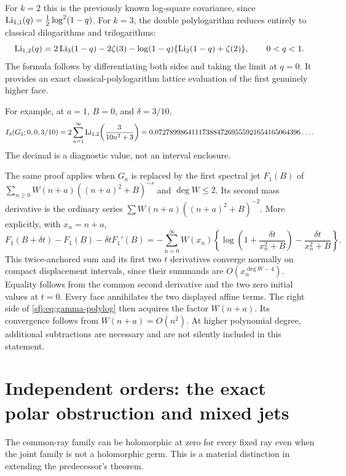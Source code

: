 For $k=2$ this is the previously known log-square covariance,
since $\operatorname{Li}_{1,1}(q)=\frac12\log^2(1-q)$.  For $k=3$, the double
polylogarithm reduces entirely to classical dilogarithms and
trilogarithms:
\begin{equation}\label{sfj:eq:Li12-classical}
 \operatorname{Li}_{1,2}(q)=2\operatorname{Li}_3(1-q)-2\zeta(3)
            -\log(1-q)\{\operatorname{Li}_2(1-q)+\zeta(2)\},\qquad 0<q<1.
\end{equation}
The formula follows by differentiating both sides and taking the
limit at $q=0$.  It provides an exact classical-polylogarithm lattice
evaluation of the first genuinely higher face.

For example, at $a=1$, $B=0$, and $\delta=3/10$,
\begin{equation}\label{sfj:eq:numeric-example}
 I_3(G_1;0,0,3/10)
   =2\sum_{n=1}^\infty\operatorname{Li}_{1,2}\!\left(\frac{3}{10n^2+3}\right)
   =0.0727899864111738847269555921654165064396\ldots.
\end{equation}
The decimal is a diagnostic value, not an interval enclosure.

\begin{remark}
The same proof applies when $G_a$ is replaced by the first spectral
jet $F_1(B)$ of $\sum_{n\ge0}W(n+a)((n+a)^2+B)^{-s}$ and
$\deg W\le2$.  Its second mass derivative is the ordinary series
$\sum W(n+a)((n+a)^2+B)^{-2}$.  More explicitly, with $x_n=n+a$,
\[
 F_1(B+\delta t)-F_1(B)-\delta tF_1'(B)
 =-\sum_{n=0}^{\infty}W(x_n)
   \left\{\log\left(1+\frac{\delta t}{x_n^2+B}\right)
                       -\frac{\delta t}{x_n^2+B}\right\}.
\]
This twice-anchored sum and its first two $t$ derivatives converge
normally on compact displacement intervals, since their summands are
$O(x_n^{\deg W-4})$.  Equality follows from the common second
derivative and the two zero initial values at $t=0$.  Every face
annihilates the two displayed affine terms.  The right side of
\eqref{sfj:eq:gamma-polylog}
then acquires the factor $W(n+a)$.  Its convergence follows from
$W(n+a)=O(n^2)$.  At higher polynomial degree, additional subtractions
are necessary and are not silently included in this statement.
\end{remark}

\section{Independent orders: the exact polar obstruction and mixed jets}
\label{sfj:sec:independent}

The common-ray family can be holomorphic at zero for every fixed ray
even when the joint family is not a holomorphic germ.  This is a
material distinction in extending the predecessor's theorem.

